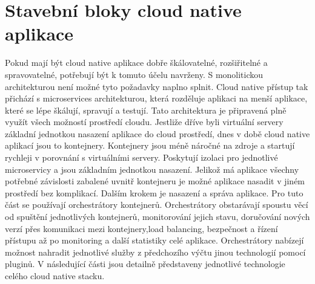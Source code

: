 \section{Stavební bloky cloud native aplikace}
		Pokud mají být cloud native aplikace dobře škálovatelné, rozšiřitelné a spravovatelné, potřebují být k tomuto účelu navrženy. S monolitickou architekturou není možné tyto požadavky naplno splnit. Cloud native přístup tak přichází s microservices architekturou, která rozděluje aplikaci na menší aplikace, které se lépe škálují, spravují a testují. Tato architektura je připravená plně využít všech možností prostředí cloudu. Jestliže dříve byli virtuální servery základní jednotkou nasazení aplikace do cloud prostředí, dnes v době cloud native aplikací jsou to kontejnery. Kontejnery jsou méně náročné na zdroje a startují rychleji v porovnání s virtuálními servery. Poskytují izolaci pro jednotlivé microservicy a jsou základním jednotkou nasazení. Jelikož má aplikace všechny potřebné závislosti zabalené uvnitř kontejneru je možné aplikace nasadit v jiném \linebreak prostředí bez komplikací. Dalším krokem je nasazení a správa aplikace. Pro tuto část se používají orchestrátory kontejnerů. Orchestrátory obstarávají spoustu věcí od spuštění jednotlivých kontejnerů, monitorování jejich stavu, doručování nových verzí přes komunikaci mezi kontejnery,load balancing, bezpečnost a řízení přístupu až po monitoring a další statistiky celé aplikace. Orchestrátory nabízejí možnost nahradit jednotlivé služby z předchozího výčtu jinou technologií pomocí pluginů. V následující části jsou detailně představeny jednotlivé technologie celého cloud native stacku.

